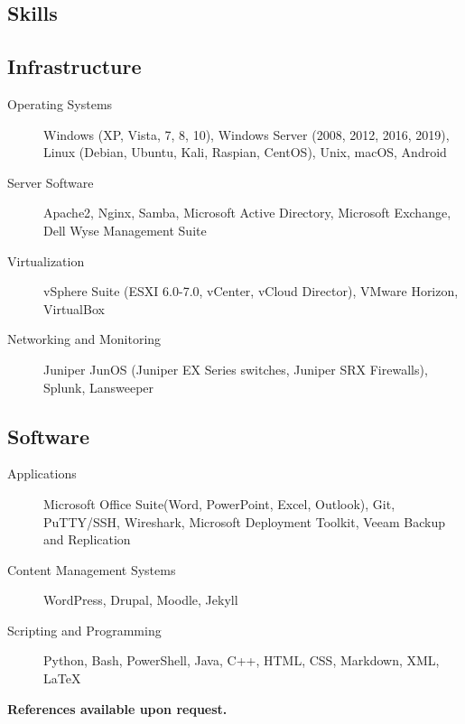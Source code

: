 \documentclass{article}
\begin{document}
\begin{samepage}
\section{Skills}

\subsection{Infrastructure}
\begin{description}
\item[Operating Systems] Windows (XP, Vista, 7, 8, 10), Windows Server (2008, 2012, 2016, 2019), Linux (Debian, Ubuntu, Kali, Raspian, CentOS), Unix,  macOS, Android
\item[Server Software] Apache2, Nginx, Samba, Microsoft Active Directory, Microsoft Exchange, Dell Wyse Management Suite
\item[Virtualization] vSphere Suite (ESXI 6.0-7.0, vCenter, vCloud Director), VMware Horizon, VirtualBox
\item[Networking and Monitoring] Juniper JunOS (Juniper EX Series switches, Juniper SRX Firewalls), Splunk, Lansweeper
\end{description}

\subsection{Software}

\begin{description}
\item[Applications] Microsoft Office Suite(Word, PowerPoint, Excel, Outlook), Git, PuTTY/SSH, Wireshark, Microsoft Deployment Toolkit, Veeam Backup and Replication
\item[Content Management Systems] WordPress, Drupal, Moodle, Jekyll
\item[Scripting and Programming] Python, Bash, PowerShell, Java, C++, HTML, CSS, Markdown, XML, {\LaTeX}
\end{description}


\begin{center}
\textbf{References available upon request.}
\end{center}

\thispagestyle{empty}
\end{samepage}
\end{document}
